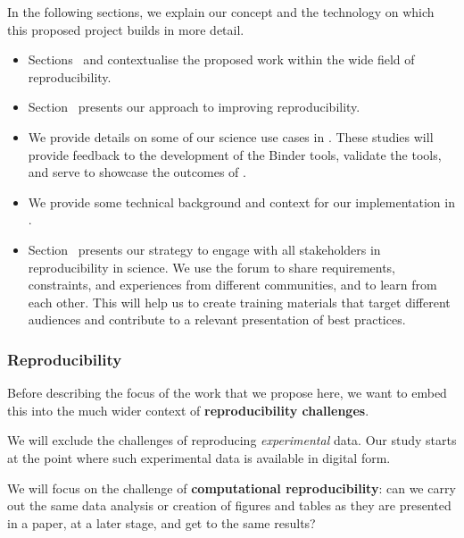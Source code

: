 In the following sections, we explain our concept and the technology on which this
proposed project builds in more detail.
\begin{itemize}
  \itemsep0em
\item Sections~ and
   contextualise the proposed work
  within the wide field of reproducibility.
\item Section~ presents our approach to improving reproducibility.
\item We provide details on some of our science use cases in
  . These studies will provide feedback to the development of the
  Binder tools, validate the tools, and serve to showcase the outcomes of
  \TheProject.
\item We provide some technical background and context for our implementation in .
\item Section~ presents our strategy to
  engage with all stakeholders in reproducibility in science. We use the forum to
  share requirements, constraints, and experiences from different communities,
  and to learn from each other. This will help us to
  create training materials that target different audiences and
  contribute to a relevant presentation of best practices.

\end{itemize}

\medskip

\subsubsection{Reproducibility}\label{sec:concept}\label{sec:reproducibility}

Before describing the focus of the work that we propose here, we want to embed
this into the much wider context of \textbf{reproducibility challenges}.

We will exclude the challenges of reproducing \emph{experimental} data. Our
study starts at the point where such experimental data is available in digital
form.

We will focus on the challenge of \textbf{computational reproducibility}: can we carry out
the same data analysis or creation of figures and tables as they are presented in
a paper, at a later stage, and get to the same results?

